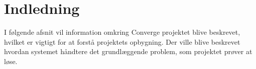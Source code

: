 \chapter{Indledning}

I følgende afsnit vil information omkring Converge projektet blive beskrevet, hvilket er vigtigt for at forstå projektets opbygning. Der ville blive beskrevet hvordan systemet håndtere det grundlæggende problem, som projektet prøver at løse.
